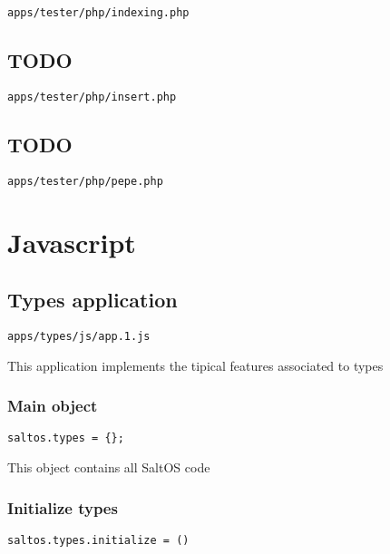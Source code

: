 \documentclass[a4paper]{book}
\begin{document}
\begin{lstlisting}
apps/tester/php/indexing.php
\end{lstlisting}

\hypertarget{toc104}{}
\section{TODO}

\begin{lstlisting}
apps/tester/php/insert.php
\end{lstlisting}

\hypertarget{toc105}{}
\section{TODO}

\begin{lstlisting}
apps/tester/php/pepe.php
\end{lstlisting}


\hypertarget{toc106}{}
\chapter{Javascript}

\hypertarget{toc107}{}
\section{Types application}

\begin{lstlisting}
apps/types/js/app.1.js
\end{lstlisting}

This application implements the tipical features associated to types

\hypertarget{toc108}{}
\subsection{Main object}

\begin{lstlisting}
saltos.types = {};
\end{lstlisting}

This object contains all SaltOS code

\hypertarget{toc109}{}
\subsection{Initialize types}

\begin{lstlisting}
saltos.types.initialize = ()
\end{lstlisting}
\end{document}
